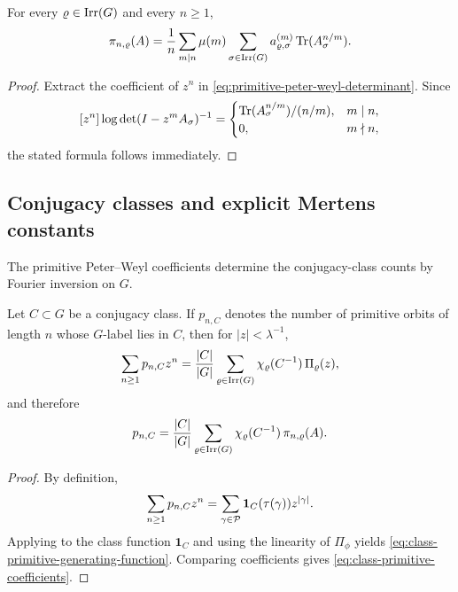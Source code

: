 \begin{corollary}
  \label{cor:primitive-peter-weyl-trace}
  For every \(\varrho\in\operatorname{Irr}(G)\) and every \(n\ge 1\),
  \begin{equation}\label{eq:primitive-peter-weyl-trace}
    \pi_{n,\varrho}(A)
    =
    \frac{1}{n}\sum_{m\mid n}\mu(m)
      \sum_{\sigma\in\operatorname{Irr}(G)}
        a_{\varrho,\sigma}^{(m)}
        \operatorname{Tr}(A_\sigma^{n/m}).
  \end{equation}
\end{corollary}

\begin{proof}
  Extract the coefficient of \(z^n\) in
  \eqref{eq:primitive-peter-weyl-determinant}. Since
  \[
    [z^n]\log\det(I-z^mA_\sigma)^{-1}
    =
    \begin{cases}
      \operatorname{Tr}(A_\sigma^{n/m})/(n/m), & m\mid n, \\
      0, & m\nmid n,
    \end{cases}
  \]
  the stated formula follows immediately.
\end{proof}

\subsection{Conjugacy classes and explicit Mertens constants}

The primitive Peter--Weyl coefficients determine the conjugacy-class
counts by Fourier inversion on \(G\).

\begin{theorem}
  \label{thm:class-primitive-decomposition}
  Let \(C\subset G\) be a conjugacy class. If \(p_{n,C}\) denotes the
  number of primitive orbits of length \(n\) whose \(G\)-label lies in
  \(C\), then for \(|z|<\lambda^{-1}\),
  \begin{equation}\label{eq:class-primitive-generating-function}
    \sum_{n\ge 1}p_{n,C}z^n
    =
    \frac{|C|}{|G|}
      \sum_{\varrho\in\operatorname{Irr}(G)}
        \chi_\varrho(C^{-1})\,\Pi_\varrho(z),
  \end{equation}
  and therefore
  \begin{equation}\label{eq:class-primitive-coefficients}
    p_{n,C}
    =
    \frac{|C|}{|G|}
      \sum_{\varrho\in\operatorname{Irr}(G)}
        \chi_\varrho(C^{-1})\,\pi_{n,\varrho}(A).
  \end{equation}
\end{theorem}

\begin{proof}
  By definition,
  \[
    \sum_{n\ge 1}p_{n,C}z^n
    =
    \sum_{\gamma\in\mathcal P}\mathbf 1_C(\tau(\gamma))z^{|\gamma|}.
  \]
  Applying  to the class function
  \(\mathbf 1_C\) and using the linearity of \(\Pi_\phi\) yields
  \eqref{eq:class-primitive-generating-function}. Comparing coefficients
  gives \eqref{eq:class-primitive-coefficients}.
\end{proof}

